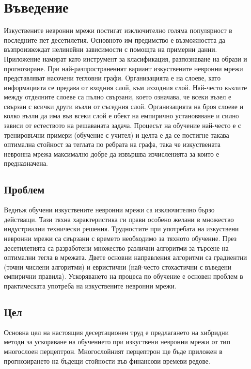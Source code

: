 ﻿
\chapter*{Въведение}

Изкуствените невронни мрежи постигат изключително голяма популярност в последните пет десетилетия. Основното им предимство е възможността да възпроизвеждат нелинейни зависимости с помощта на примерни данни. Приложение намират като инструмент за класификация, разпознаване на образи и прогнозиране. При най-разпространеният вариант изкуствените невронни мрежи представляват насочени тегловни графи. Организацията е на слоеве, като информацията се предава от входния слой, към изходния слой. Най-често възлите между отделните слоеве са пълно свързани, което означава, че всеки възел е свързан с всички други възли от съседния слой. Организацията на броя слоеве и колко възли да има във всеки слой е обект на емпирично установяване и силно зависи от естеството на решаваната задача. Процесът на обучение най-често е с тренировъчни примери (обучение с учител) и целта е да се постигне такава оптимална стойност за теглата по ребрата на графа, така че изкуствената невронна мрежа максимално добре да извършва изчисленията за които е предназначена. 

\section*{Проблем}

Веднъж обучени изкуствените невронни мрежи са изключително бързо действащи. Тази тяхна характеристика ги прави особено желани в множество индустриални технически решения. Трудностите при употребата на изкуствени невронни мрежи са свързани с времето необходимо за тяхното обучение. През десетилетията са разработени множество различни алгоритми за търсене на оптимални тегла в мрежата. Двете основни направления алгоритми са градиентни (точни числени алгоритми) и евристични (най-често стохастични с въведени емпирични правила). Ускоряването на процеса по обучение е основен проблем в практическата употреба на изкуствените невронни мрежи.

\section*{Цел}

Основна цел на настоящия десертационен труд е предлагането на хибридни методи за ускоряване на обучението при изкуствени невронни мрежи от тип многослоен перцептрон. Многослойният перцептрон ще бъде приложен в прогнозирането на бъдещи стойности във финансови времеви редове. 

